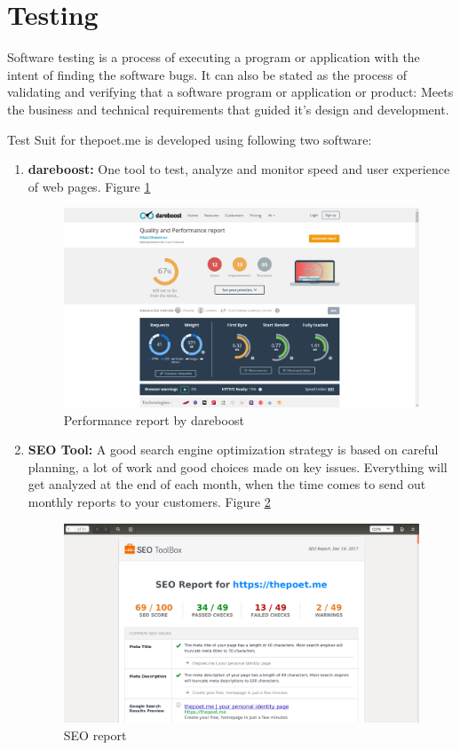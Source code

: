 \section{Testing}
Software testing is a process of executing a program or application with the intent of finding the software bugs. It can also be stated as the process of validating and verifying that a software program or application or product: Meets the business and technical requirements that guided it's design and development.

Test Suit for thepoet.me is developed using following two software:

\begin{enumerate}
    \item \textbf{dareboost:} One tool to test, analyze and monitor
    speed and user experience of web pages. Figure \ref{dare}
     \begin{figure}
         \centering
         \includegraphics[width=\linewidth]{images/dareboost.png}
         \caption{Performance report by dareboost}
         \label{dare}
     \end{figure}

    \item \textbf{SEO Tool:} A good search engine optimization strategy is based on careful planning, a lot of work and good choices made on key issues. Everything will get analyzed at the end of each month, when the time comes to send out monthly reports to your customers. Figure \ref{dare1}
     \begin{figure}
         \centering
         \includegraphics[width=\linewidth]{images/seotool.png}
         \caption{SEO report}
         \label{dare1}
     \end{figure}

\end{enumerate}




